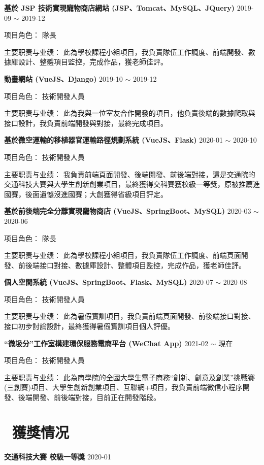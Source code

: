 \documentclass[12pt, a4paper]{article}
\begin{document}
\textbf{基於 JSP 技術實現寵物商店網站 (JSP、Tomcat、MySQL、JQuery)} \hfill 2019-09 $\sim$ 2019-12

项目角色： \quad 隊長

主要职责与业绩： \quad 此為學校課程小組項目，我負責隊伍工作調度、前端開發、數據庫設計、整體項目監控，完成作品，獲老師佳評。

\textbf{動畫網站 (VueJS、Django)} \hfill 2019-10 $\sim$ 2019-12

项目角色： \quad 技術開發人員

主要职责与业绩： \quad 此為我與一位室友合作開發的項目，他負責後端的數據爬取與接口設計，我負責前端開發與對接，最終完成項目。

\textbf{基於微空運輸的移植器官運輸路徑規劃系統 (VueJS、Flask)} \hfill 2020-01 $\sim$ 2020-10

项目角色： \quad 技術開發人員

主要职责与业绩： \quad 我負責前端頁面開發、後端開發、前後端對接，這是交通院的交通科技大賽與大學生創新創業項目，最終獲得交科賽獲校級一等獎，原被推薦進國賽，後面遺憾沒進國賽；大創獲得省級項目評定。

\textbf{基於前後端完全分離實現寵物商店 (VueJS、SpringBoot、MySQL)} \hfill 2020-03 $\sim$ 2020-06

项目角色： \quad 隊長

主要职责与业绩： \quad 此為學校課程小組項目，我負責隊伍工作調度、前端頁面開發、前後端接口對接、數據庫設計、整體項目監控，完成作品，獲老師佳評。

\textbf{個人空間系統 (VueJS、SpringBoot、Flask、MySQL)} \hfill 2020-07 $\sim$ 2020-08

项目角色： \quad 技術開發人員

主要职责与业绩： \quad 此為暑假實訓項目，我負責前端頁面開發、前後端接口對接、接口初步討論設計，最終獲得暑假實訓項目個人評優。

\textbf{``微圾分''工作室構建環保服務電商平台 (WeChat App)} \hfill 2021-02 $\sim$ 現在

项目角色： \quad 技術開發人員

主要职责与业绩： \quad 此為商學院的全國大學生電子商務“創新、創意及創業”挑戰賽(三創賽)項目、大學生創新創業項目、互聯網+項目，我負責前端微信小程序開發、後端開發、前後端對接，目前正在開發階段。

\section{\color{CVBlue}\faHeart\ 獲獎情况}

\textbf{交通科技大賽 \quad 校級一等獎} \hfill 2020-01
\end{document}
